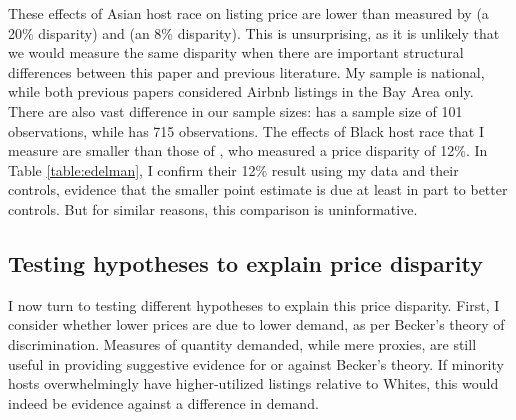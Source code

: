 These effects of Asian host race on listing price are lower than measured by \cite{wang} (a 20\% disparity) and \cite{kakar} (an 8\% disparity). This is unsurprising, as it is unlikely that we would measure the same disparity when there are important structural differences between this paper and previous literature. My sample is national, while both previous papers considered Airbnb listings in the Bay Area only. There are also vast difference in our sample sizes: \cite{wang} has a sample size of 101 observations, while \cite{kakar} has 715 observations. The effects of Black host race that I measure are smaller than those of \cite{edelman}, who measured a price disparity of 12\%.  In Table \ref{table:edelman}, I confirm their 12\% result using my data and their controls, evidence that the smaller point estimate is due at least in part to better controls. But for similar reasons, this comparison is uninformative.





\subsection{Testing hypotheses to explain price disparity}

I now turn to testing different hypotheses to explain this price disparity. First, I consider whether lower prices are due to lower demand, as per Becker's theory of discrimination. Measures of quantity demanded, while mere proxies, are still useful in providing suggestive evidence for or against Becker's theory. If minority hosts overwhelmingly have higher-utilized listings relative to Whites, this would indeed be evidence against a difference in demand.

